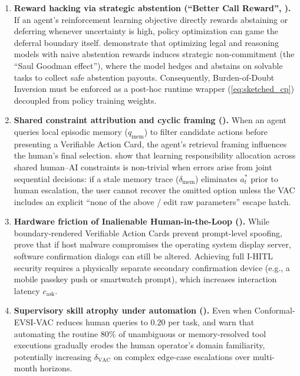\documentclass[11pt]{article}
\begin{document}
\begin{enumerate}
  \item \textbf{Reward hacking via strategic abstention (``Better Call Reward'', \citet{sahoo2026bettercall}).} If an agent's reinforcement learning objective directly rewards abstaining or deferring whenever uncertainty is high, policy optimization can game the deferral boundary itself. \citet{sahoo2026bettercall} demonstrate that optimizing legal and reasoning models with naive abstention rewards induces strategic non-commitment (the ``Saul Goodman effect''), where the model hedges and abstains on solvable tasks to collect safe abstention payouts. Consequently, Burden-of-Doubt Inversion must be enforced as a post-hoc runtime wrapper (\ref{eq:sketched_cp}) decoupled from policy training weights.
  \item \textbf{Shared constraint attribution and cyclic framing (\citet{cao2026lira, vaccaro2024combinations}).} When an agent queries local episodic memory ($q_{\mathrm{mem}}$) to filter candidate actions before presenting a Verifiable Action Card, the agent's retrieval framing influences the human's final selection. \citet{cao2026lira} show that learning responsibility allocation across shared human--AI constraints is non-trivial when errors arise from joint sequential decisions: if a stale memory trace ($\delta_{\mathrm{mem}}$) eliminates $a_t^*$ prior to human escalation, the user cannot recover the omitted option unless the VAC includes an explicit ``none of the above / edit raw parameters'' escape hatch.
  \item \textbf{Hardware friction of Inalienable Human-in-the-Loop (\citet{breckenridge2026ihitl}).} While boundary-rendered Verifiable Action Cards \citep{zhao2026clawguard} prevent prompt-level spoofing, \citet{breckenridge2026ihitl} prove that if host malware compromises the operating system display server, software confirmation dialogs can still be altered. Achieving full I-HITL security requires a physically separate secondary confirmation device (e.g., a mobile passkey push or smartwatch prompt), which increases interaction latency $c_{\mathrm{ask}}$.
  \item \textbf{Supervisory skill atrophy under automation (\citet{bainbridge1983ironies, eliav2026divergence, lee2025critical}).} Even when Conformal-EVSI-VAC reduces human queries to $0.20$ per task, \citet{bainbridge1983ironies} and \citet{lee2025critical} warn that automating the routine $80\%$ of unambiguous or memory-resolved tool executions gradually erodes the human operator's domain familiarity, potentially increasing $\delta_{\mathrm{VAC}}$ on complex edge-case escalations over multi-month horizons.
\end{enumerate}
\end{document}
